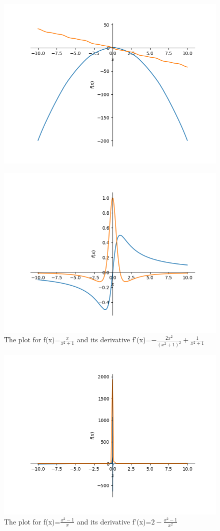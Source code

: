 \documentclass{article}
\begin{document}
\begin{figure}
\includegraphics{plot_5}
\end{figure}\begin{figure}
\caption{The plot for f(x)=$\frac{x}{x^{2} + 1}$ and its derivative f'(x)=$- \frac{2 x^{2}}{\left(x^{2} + 1\right)^{2}} + \frac{1}{x^{2} + 1}$}
\centering
\includegraphics{plot_6}
\end{figure}\begin{figure}
\caption{The plot for f(x)=$\frac{x^{2} - 1}{x}$ and its derivative f'(x)=$2 - \frac{x^{2} - 1}{x^{2}}$}
\centering
\includegraphics{plot_7}

\end{figure}
\end{document}
